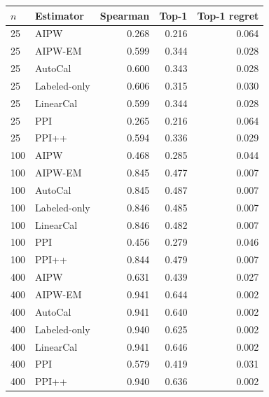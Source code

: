 \begin{tabular}{llrrr}
\toprule
$n$ & Estimator & Spearman & Top-1 & Top-1 regret \\
\midrule
25 & AIPW & 0.268 & 0.216 & 0.064 \\
25 & AIPW-EM & 0.599 & 0.344 & 0.028 \\
25 & AutoCal & 0.600 & 0.343 & 0.028 \\
25 & Labeled-only & 0.606 & 0.315 & 0.030 \\
25 & LinearCal & 0.599 & 0.344 & 0.028 \\
25 & PPI & 0.265 & 0.216 & 0.064 \\
25 & PPI++ & 0.594 & 0.336 & 0.029 \\
100 & AIPW & 0.468 & 0.285 & 0.044 \\
100 & AIPW-EM & 0.845 & 0.477 & 0.007 \\
100 & AutoCal & 0.845 & 0.487 & 0.007 \\
100 & Labeled-only & 0.846 & 0.485 & 0.007 \\
100 & LinearCal & 0.846 & 0.482 & 0.007 \\
100 & PPI & 0.456 & 0.279 & 0.046 \\
100 & PPI++ & 0.844 & 0.479 & 0.007 \\
400 & AIPW & 0.631 & 0.439 & 0.027 \\
400 & AIPW-EM & 0.941 & 0.644 & 0.002 \\
400 & AutoCal & 0.941 & 0.640 & 0.002 \\
400 & Labeled-only & 0.940 & 0.625 & 0.002 \\
400 & LinearCal & 0.941 & 0.646 & 0.002 \\
400 & PPI & 0.579 & 0.419 & 0.031 \\
400 & PPI++ & 0.940 & 0.636 & 0.002 \\
\bottomrule
\end{tabular}
